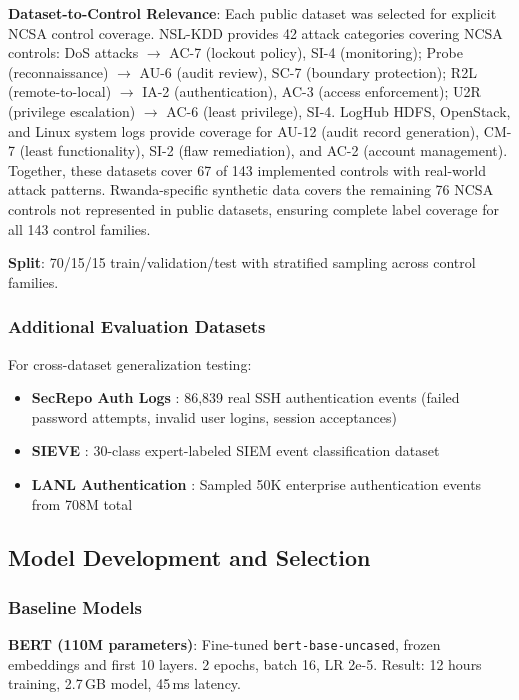 \documentclass[11pt,conference]{IEEEtran}
\begin{document}
\textbf{Dataset-to-Control Relevance}: Each public dataset was selected for explicit NCSA control coverage. NSL-KDD \cite{nslkdd} provides 42 attack categories covering NCSA controls: DoS attacks $\rightarrow$ AC-7 (lockout policy), SI-4 (monitoring); Probe (reconnaissance) $\rightarrow$ AU-6 (audit review), SC-7 (boundary protection); R2L (remote-to-local) $\rightarrow$ IA-2 (authentication), AC-3 (access enforcement); U2R (privilege escalation) $\rightarrow$ AC-6 (least privilege), SI-4. LogHub \cite{loghub} HDFS, OpenStack, and Linux system logs provide coverage for AU-12 (audit record generation), CM-7 (least functionality), SI-2 (flaw remediation), and AC-2 (account management). Together, these datasets cover 67 of 143 implemented controls with real-world attack patterns. Rwanda-specific synthetic data covers the remaining 76 NCSA controls not represented in public datasets, ensuring complete label coverage for all 143 control families.

\textbf{Split}: 70/15/15 train/validation/test with stratified sampling across control families.

\subsubsection{Additional Evaluation Datasets}

For cross-dataset generalization testing:
\begin{itemize}
    \item \textbf{SecRepo Auth Logs} \cite{secrepo}: 86,839 real SSH authentication events (failed password attempts, invalid user logins, session acceptances)
    \item \textbf{SIEVE} \cite{sieve_dataset}: 30-class expert-labeled SIEM event classification dataset
    \item \textbf{LANL Authentication} \cite{lanl_auth}: Sampled 50K enterprise authentication events from 708M total
\end{itemize}

\subsection{Model Development and Selection}

\subsubsection{Baseline Models}

\textbf{BERT (110M parameters)}: Fine-tuned \texttt{bert-base-uncased}, frozen embeddings and first 10 layers. 2 epochs, batch 16, LR 2e-5. Result: 12 hours training, 2.7\,GB model, 45\,ms latency.
\end{document}
